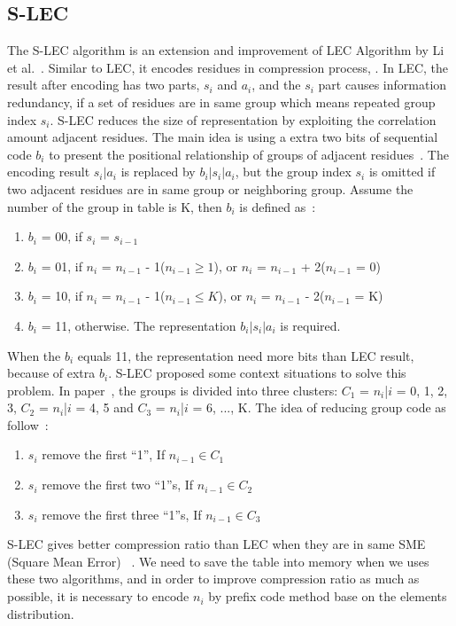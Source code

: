 \subsection{S-LEC}
The S-LEC algorithm is an extension and improvement of LEC Algorithm by Li et
al.~\cite{li2016temporal}. Similar to LEC, it encodes residues in compression
process, . In LEC, the result after
encoding has two parts, $s_i$ and $ a_i$, and the $s_i$ part causes 
information redundancy, if a set of residues are in same group which means
repeated group index $s_i$. S-LEC reduces the size of representation by
exploiting the correlation amount adjacent residues. The main idea is using a
extra two bits of sequential code $b_i$ to present the positional relationship
of groups of adjacent residues~\cite{li2016temporal}. The encoding result
$s_i|a_i$ is replaced by $b_i|s_i|a_i$, but the group index $s_i$ is
omitted if two adjacent residues are in same group or neighboring group. Assume
the number of the group in table is K, then $b_i$ is defined
as~\cite{li2016temporal}: 

\begin{enumerate}
    \item $b_i$ = 00, if $s_i$ = $s_{i-1}$
    \item $b_i$ = 01, if $n_i$ = $n_{i-1}$ - 1($n_{i-1} \geqslant 1$), or $n_i$
    = $n_{i-1}$ + 2($n_{i-1}$ = 0)
    \item $b_i$ = 10, if $n_i$ = $n_{i-1}$ - 1($n_{i-1} \leqslant K$), or $n_i$
    = $n_{i-1}$ - 2($n_{i-1}$ = K)
    \item $b_i$ = 11, otherwise. The representation $b_i|s_i|a_i$ is required. 
  \end{enumerate}

When the $b_i$ equals 11, the representation need more bits than LEC result,
because of extra $b_i$. S-LEC proposed some context situations to solve this
problem. In paper~\cite{li2016temporal}, the groups is divided into three
clusters: $C_1$ = {$n_i$|$i$ = 0, 1, 2, 3}, $C_2$ = {$n_i$|$i$ = 4, 5} and 
$C_3$ = {$n_i$|$i$ = 6, ..., K}. The idea of reducing group code as
follow~\cite{li2016temporal}:

\begin{enumerate}
    \item $s_i$ remove the first ``1'', If $n_{i-1} \in C_1$
    \item $s_i$ remove the first two ``1''s, If $n_{i-1} \in C_2$
    \item $s_i$ remove the first three ``1''s, If $n_{i-1} \in C_3$
\end{enumerate}
S-LEC gives better compression ratio than LEC when they are in same SME
(Square Mean Error)~\cite{li2016temporal} . We need to save the table into memory when we uses these
two algorithms, and in order to improve compression ratio as much as
possible, it is necessary to encode $n_i$ by prefix code method base on the
elements distribution.


